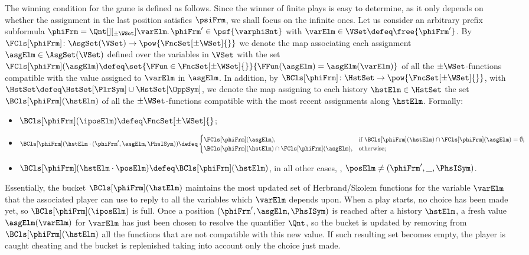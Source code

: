 \documentclass[authoryear]{elsarticle}
\begin{document}
The winning condition for the game is defined as follows.
Since the winner of finite plays is easy to determine, as it only depends on
whether the assignment in the last position satisfies $\psiFrm$, we shall focus
on the infinite ones.
Let us consider an arbitrary prefix subformula $\phiFrm = \Qnt[][_{\pm\WSet}]
\varElm \ldotp \phiFrm' \in \psf{\varphiSnt}$ with $\varElm \in \VSet \defeq
\free{\phiFrm'}$.
By $\FCls[\phiFrm] \colon \AsgSet(\VSet) \to \pow{\FncSet[\pm\WSet]{}}$ we
denote the map associating each assignment $\asgElm \in \AsgSet(\VSet)$ defined
over the variables in $\VSet$ with the set $\FCls[\phiFrm](\asgElm) \defeq \set{
\FFun \in \FncSet[\pm\WSet]{} }{ \FFun(\asgElm) = \asgElm(\varElm) }$ of all the
$\pm\WSet$-functions compatible with the value assigned to $\varElm$ in
$\asgElm$.
In addition, by $\BCls[\phiFrm] \colon \HstSet \to \pow{\FncSet[\pm\WSet]{}}$,
with $\HstSet \defeq \HstSet[\PlrSym] \cup \HstSet[\OppSym]$, we denote the map
assigning to each history $\hstElm \in \HstSet$ the set
$\BCls[\phiFrm](\hstElm)$ of all the $\pm\WSet$-functions compatible with the
most recent assignments along $\hstElm$.
Formally:
\begin{itemize}[$\bullet$]
  \item
    $\BCls[\phiFrm](\iposElm) \defeq \FncSet[\pm\WSet]{}$;
  \item
    $\BCls[\phiFrm](\hstElm \cdot (\phiFrm', \asgElm, \PhsISym)) \defeq
    \begin{cases}
      {\FCls[\phiFrm](\asgElm)},
    & \text{if } {\BCls[\phiFrm](\hstElm) \cap \FCls[\phiFrm](\asgElm)} =
      \emptyset; \\
      {\BCls[\phiFrm](\hstElm) \cap \FCls[\phiFrm](\asgElm)},
    & \text{otherwise};
    \end{cases}$
  \item
    $\BCls[\phiFrm](\hstElm \cdot \posElm) \defeq \BCls[\phiFrm](\hstElm)$, in
    all other cases, \ie, $\posElm \neq (\phiFrm', \_, \PhsISym)$.
\end{itemize}
Essentially, the bucket $\BCls[\phiFrm](\hstElm)$ maintains the most updated set
of Herbrand/Skolem functions for the variable $\varElm$ that the associated
player can use to reply to all the variables which $\varElm$ depends upon.
When a play starts, no choice has been made yet, so $\BCls[\phiFrm](\iposElm)$
is full.
Once a position $(\phiFrm', \asgElm, \PhsISym)$ is reached after a history
$\hstElm$, a fresh value $\asgElm(\varElm)$ for $\varElm$ has just been chosen
to resolve the quantifier $\Qnt$, so the bucket is updated by removing from
$\BCls[\phiFrm](\hstElm)$ all the functions that are not compatible with this
new value.
If such resulting set becomes empty, the player is caught cheating and the
bucket is replenished taking into account only the choice just made.
\end{document}
